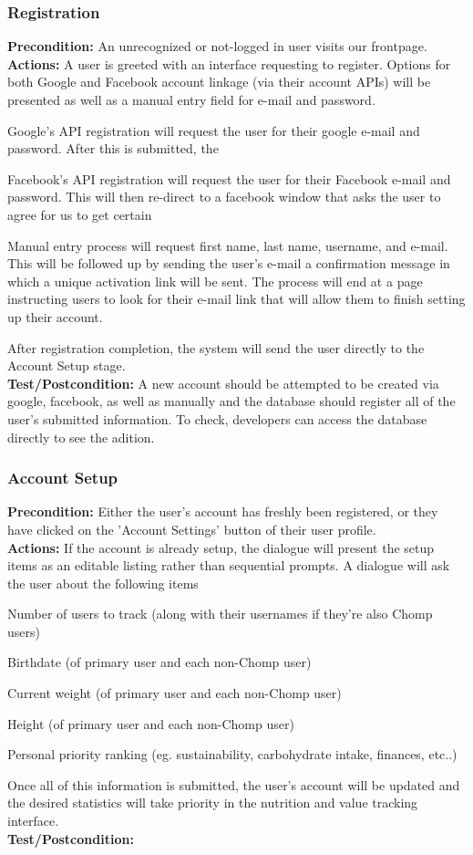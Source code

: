 \documentclass[a4paper,12pt]{article}
\begin{document}
\subsubsection{Registration}
\textbf{Precondition:} An unrecognized or not-logged in user visits our frontpage.\\
\textbf{Actions:} A user is greeted with an interface requesting to register.  Options for both Google and Facebook account linkage (via their account APIs) will be presented as well as a manual entry field for e-mail and password. \begin{list}{•}{•}
\item Google's API registration will request the user for their google e-mail and password.  After this is submitted, the
\item Facebook's API registration will request the user for their Facebook e-mail and password.  This will then re-direct to a facebook window that asks the user to agree for us to get certain 
\item Manual entry process will request first name, last name, username, and e-mail.  This will be followed up by sending the user's e-mail a confirmation message in which a unique activation link will be sent.  The process will end at a page instructing users to look for their e-mail link that will allow them to finish setting up their account.
\end{list}
After registration completion, the system will send the user directly to the Account Setup stage.\\
\textbf{Test/Postcondition:} A new account should be attempted to be created via google, facebook, as well as manually and the database should register all of the user's submitted information.  To check, developers can access the database directly to see the adition.
\subsubsection{Account Setup}
\textbf{Precondition:} Either the user's account has freshly been registered, or they have clicked on the 'Account Settings' button of their user profile.\\
\textbf{Actions:} If the account is already setup, the dialogue will present the setup items as an editable listing rather than sequential prompts.  A dialogue will ask the user about the following items\begin{list}{•}{•}
\item Number of users to track (along with their usernames if they're also Chomp users)
\item Birthdate (of primary user and each non-Chomp user)
\item Current weight (of primary user and each non-Chomp user)
\item Height (of primary user and each non-Chomp user)
\item Personal priority ranking (eg. sustainability, carbohydrate intake, finances, etc..)
\end{list}
Once all of this information is submitted, the user's account will be updated and the desired statistics will take priority in the nutrition and value tracking interface.\\
\textbf{Test/Postcondition:} 
\end{document}
